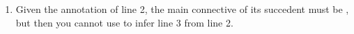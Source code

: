 \begin{enumerate}
\begin{enumerate}
\item
\begin{argumentN}[1]




\end{argumentN}

\opts{
  
 \dotline
 \dotline

}
{
 Given the annotation of line 2, the main connective of its succedent must be 
 \p{\lor}, but then you cannot use \negE{} to infer line 3 from line 2.
}

\end{enumerate}

\end{enumerate}
